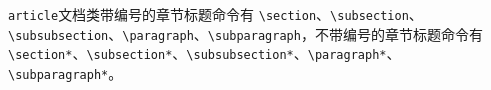 \documentclass[12pt,a4paper]{ctexart}
\begin{document}
\verb|article|文档类带编号的章节标题命令有 \verb|\section|、\verb|\subsection|、\\\verb|\subsubsection|、\verb|\paragraph|、\verb|\subparagraph|，不带编号的章节标题命令有\\ \verb|\section*|、\verb|\subsection*|、\verb|\subsubsection*|、\verb|\paragraph*|、\verb|\subparagraph*|。
\end{document}
